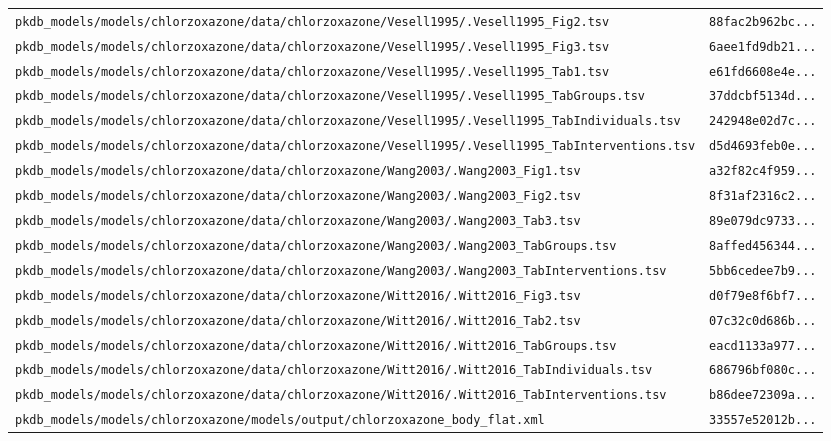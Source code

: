 \begin{longtable}{ll}
\texttt{pkdb\_models/models/chlorzoxazone/data/chlorzoxazone/Vesell1995/.Vesell1995\_Fig2.tsv} & \texttt{88fac2b962bc...} \\
\texttt{pkdb\_models/models/chlorzoxazone/data/chlorzoxazone/Vesell1995/.Vesell1995\_Fig3.tsv} & \texttt{6aee1fd9db21...} \\
\texttt{pkdb\_models/models/chlorzoxazone/data/chlorzoxazone/Vesell1995/.Vesell1995\_Tab1.tsv} & \texttt{e61fd6608e4e...} \\
\texttt{pkdb\_models/models/chlorzoxazone/data/chlorzoxazone/Vesell1995/.Vesell1995\_TabGroups.tsv} & \texttt{37ddcbf5134d...} \\
\texttt{pkdb\_models/models/chlorzoxazone/data/chlorzoxazone/Vesell1995/.Vesell1995\_TabIndividuals.tsv} & \texttt{242948e02d7c...} \\
\texttt{pkdb\_models/models/chlorzoxazone/data/chlorzoxazone/Vesell1995/.Vesell1995\_TabInterventions.tsv} & \texttt{d5d4693feb0e...} \\
\texttt{pkdb\_models/models/chlorzoxazone/data/chlorzoxazone/Wang2003/.Wang2003\_Fig1.tsv} & \texttt{a32f82c4f959...} \\
\texttt{pkdb\_models/models/chlorzoxazone/data/chlorzoxazone/Wang2003/.Wang2003\_Fig2.tsv} & \texttt{8f31af2316c2...} \\
\texttt{pkdb\_models/models/chlorzoxazone/data/chlorzoxazone/Wang2003/.Wang2003\_Tab3.tsv} & \texttt{89e079dc9733...} \\
\texttt{pkdb\_models/models/chlorzoxazone/data/chlorzoxazone/Wang2003/.Wang2003\_TabGroups.tsv} & \texttt{8affed456344...} \\
\texttt{pkdb\_models/models/chlorzoxazone/data/chlorzoxazone/Wang2003/.Wang2003\_TabInterventions.tsv} & \texttt{5bb6cedee7b9...} \\
\texttt{pkdb\_models/models/chlorzoxazone/data/chlorzoxazone/Witt2016/.Witt2016\_Fig3.tsv} & \texttt{d0f79e8f6bf7...} \\
\texttt{pkdb\_models/models/chlorzoxazone/data/chlorzoxazone/Witt2016/.Witt2016\_Tab2.tsv} & \texttt{07c32c0d686b...} \\
\texttt{pkdb\_models/models/chlorzoxazone/data/chlorzoxazone/Witt2016/.Witt2016\_TabGroups.tsv} & \texttt{eacd1133a977...} \\
\texttt{pkdb\_models/models/chlorzoxazone/data/chlorzoxazone/Witt2016/.Witt2016\_TabIndividuals.tsv} & \texttt{686796bf080c...} \\
\texttt{pkdb\_models/models/chlorzoxazone/data/chlorzoxazone/Witt2016/.Witt2016\_TabInterventions.tsv} & \texttt{b86dee72309a...} \\
\texttt{pkdb\_models/models/chlorzoxazone/models/output/chlorzoxazone\_body\_flat.xml} & \texttt{33557e52012b...} \\
\end{longtable}

